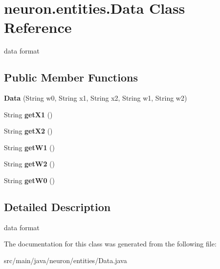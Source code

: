 \hypertarget{classneuron_1_1entities_1_1Data}{}\section{neuron.\+entities.\+Data Class Reference}
\label{classneuron_1_1entities_1_1Data}


data format  


\subsection*{Public Member Functions}
\begin{DoxyCompactItemize}
\item 
\mbox{\label{classneuron_1_1entities_1_1Data_a07a4875db2d5b992c90fe1d660151b70}} 
{\bfseries Data} (String w0, String x1, String x2, String w1, String w2)
\item 
\mbox{\label{classneuron_1_1entities_1_1Data_a46f221e4eb89674f4da11aa05a2db698}} 
String {\bfseries get\+X1} ()
\item 
\mbox{\label{classneuron_1_1entities_1_1Data_a3d2eac7f32fd655b7e89c4f97a77714f}} 
String {\bfseries get\+X2} ()
\item 
\mbox{\label{classneuron_1_1entities_1_1Data_acb19c9f678fbb66f14d3fea868e222d4}} 
String {\bfseries get\+W1} ()
\item 
\mbox{\label{classneuron_1_1entities_1_1Data_a512d5f86c8cdb9437d13beef91c429dc}} 
String {\bfseries get\+W2} ()
\item 
\mbox{\label{classneuron_1_1entities_1_1Data_add0775db124704e6032e6abdbedff658}} 
String {\bfseries get\+W0} ()
\end{DoxyCompactItemize}


\subsection{Detailed Description}
data format 

The documentation for this class was generated from the following file\+:\begin{DoxyCompactItemize}
\item 
src/main/java/neuron/entities/Data.\+java\end{DoxyCompactItemize}
